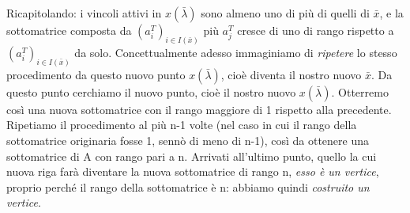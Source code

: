 \noindent Ricapitolando: i vincoli attivi in $x(\bar{\lambda})$ sono almeno uno di più di quelli di $\bar{x}$, e la sottomatrice composta da  $(a_i^T)_{i \in I(\bar{x})}$ più $a_j^T$ cresce di uno di rango rispetto a $(a_i^T)_{i \in I(\bar{x})}$ da solo. Concettualmente adesso immaginiamo di \textit{ripetere} lo stesso procedimento da questo nuovo punto $x(\bar{\lambda})$, cioè diventa il nostro nuovo $\bar{x}$. Da questo punto cerchiamo il nuovo punto, cioè il nostro nuovo $x(\bar{\lambda})$. Otterremo così una nuova sottomatrice con il rango maggiore di 1 rispetto alla precedente. Ripetiamo il procedimento al più n-1 volte (nel caso in cui il rango della sottomatrice originaria fosse 1, sennò di meno di n-1), così da ottenere una sottomatrice di A con rango pari a n. Arrivati all'ultimo punto, quello la cui nuova riga farà diventare la nuova sottomatrice di rango n, \textit{esso è un vertice}, proprio perché il rango della sottomatrice è n: abbiamo quindi \textit{costruito un vertice}.
